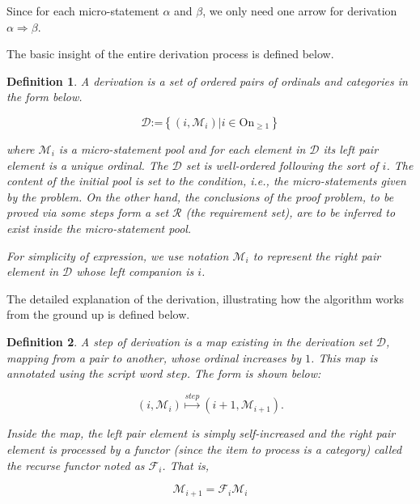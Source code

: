 \documentclass{aims}
\numberwithin{equation}{section}
\newtheorem{definition}{Definition}	%
\numberwithin{theorem}{section}	%
\numberwithin{axiom}{section}	%
\numberwithin{definition}{section}	%
\begin{document}
	Since for each micro-statement \(\alpha\) and \(\beta\), we only need one arrow for derivation \(\alpha \Rightarrow \beta\).
	
	The basic insight of the entire derivation process is defined below.
	
	\begin{definition}
		A{ derivation} is a set of ordered pairs of ordinals and categories in the form below. 
		
		\begin{equation}
			\mathcal{D}\text{:=}\left\{\left(i,\mathcal{M}_i\right)|i\in \text{On}_{\geq 1}\right\}
		\end{equation}
		
		\noindent where \(\mathcal{M}_i\) { }is a micro-statement pool and for each element in \(\mathcal{D}\) its left pair element is a unique ordinal. The $\mathcal{D}$ set is well-ordered following the sort of \(i\). The content of the initial pool is set to the condition, i.e., the micro-statements given by the problem. On the other hand, the conclusions of the proof problem, to be proved via some steps form a set \(\mathcal{R}\) (the requirement set), are to be inferred to exist inside the micro-statement pool.
		
		For simplicity of expression, we use notation \(\mathcal{M}_i\) to represent the right pair element in $\mathcal{D}$ { }whose left companion is \(i\).
	\end{definition}
	
	The detailed explanation of the derivation, illustrating how the algorithm works from the ground up is defined below.
	
	\begin{definition}
		A{ step of derivation} is a map existing in the derivation set \(\mathcal{D}\), mapping from a pair to another, whose ordinal increases by \(1\). This map is annotated using the script word \(\mathit{s}\mathit{t}\mathit{e}\mathit{p}\). The form is shown below:
		
		\begin{equation}
			\left(i,\mathcal{M}_i\right)\overset{\mathit{s}\mathit{t}\mathit{e}\mathit{p}}{\mapsto }\left(i+1,\mathcal{M}_{i+1}\right).
		\end{equation}
		
		Inside the map, the left pair element is simply self-increased and the right pair element is processed by a functor (since the item to process is a category) called the{ recurse functor} noted as \(\mathcal{F}_i\). That is,
		
		\begin{equation}
			\mathcal{M}_{i+1}=\mathcal{F}_i\mathcal{M}_i
		\end{equation}
	\end{definition}
	
\end{document}
